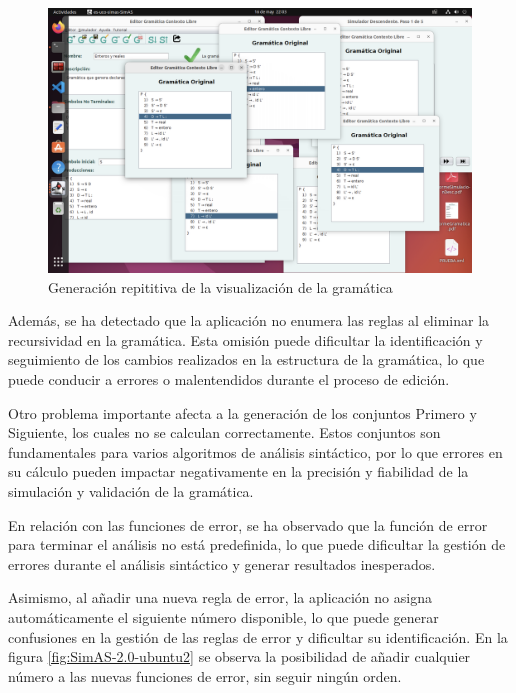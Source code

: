 \begin{figure}[htp]
 	\begin{center}
      \includegraphics[scale=0.3]{figuras/Cap3/SimAS2/fallos/ubuntu1.png} 
       \caption{Generación repititiva de la visualización de la gramática}\label{fig:SimAS-2.0-ubuntu1}
 	\end{center}
\end{figure}

Además, se ha detectado que la aplicación no enumera las reglas al eliminar la recursividad en la gramática. Esta omisión puede dificultar la identificación y seguimiento de los cambios realizados en la estructura de la gramática, lo que puede conducir a errores o malentendidos durante el proceso de edición.

Otro problema importante afecta a la generación de los conjuntos Primero y Siguiente, los cuales no se calculan correctamente. Estos conjuntos son fundamentales para varios algoritmos de análisis sintáctico, por lo que errores en su cálculo pueden impactar negativamente en la precisión y fiabilidad de la simulación y validación de la gramática.

En relación con las funciones de error, se ha observado que la función de error para terminar el análisis no está predefinida, lo que puede dificultar la gestión de errores durante el análisis sintáctico y generar resultados inesperados.

Asimismo, al añadir una nueva regla de error, la aplicación no asigna automáticamente el siguiente número disponible, lo que puede generar confusiones en la gestión de las reglas de error y dificultar su identificación. En la figura \ref{fig:SimAS-2.0-ubuntu2} se observa la posibilidad de añadir cualquier número a las nuevas funciones de error, sin seguir ningún orden.

